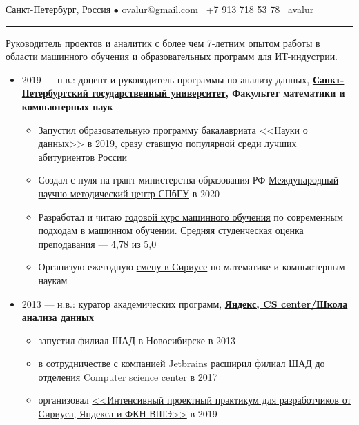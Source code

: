 \documentclass[11pt]{article}
\begin{document}
%

\vspace{0.5em}

\noindent Санкт-Петербург, Россия $\bullet$ \href{mailto:ovalur@gmail.com}{ovalur@gmail.com} \faMobile~+7 913 718 53 78
\faGithub~\href{https://github.com/avalur}{avalur}

\vspace{0.5em}
\hrule
\vspace{0.5em}

Руководитель проектов и аналитик с более чем 7-летним опытом работы в области машинного обучения и образовательных программ для ИТ-индустрии.

\vspace{0.5em}
\begin{itemize}
\item 2019 — н.в.: доцент и руководитель программы по анализу данных, \textbf{\href{https://spbu.ru}{Санкт-Петербургский государственный университет}, Факультет математики и компьютерных наук}

\begin{itemize}
	\item Запустил образовательную программу бакалавриата \href{https://maad.compscicenter.ru}{<<Науки о данных>>} в 2019, сразу ставшую популярной среди лучших абитуриентов России
	\item Создал с нуля на грант министерства образования РФ \href{https://gsom.spbu.ru/all_news/event2021-02-04/}{Международный научно-методический центр СПбГУ} в 2020
	\item Разработал и читаю \href{https://github.com/spbu-math-cs/ml-course/}{годовой курс машинного обучения} по современным подходам в машинном обучении. Средняя студенческая оценка преподавания — 4,78 из 5,0
	\item Организую ежегодную \href{https://sochisirius.ru/obuchenie/nauka/smena1078/5204}{смену в Сириусе} по математике и компьютерным наукам
\end{itemize}

\item 2013 — н.в.: куратор академических программ, \textbf{\href{https://compscicenter.ru}{Яндекс, CS center/Школа анализа данных}}
\begin{itemize}
	\item запустил филиал ШАД в Новосибирске в 2013
	\item в сотрудничестве с компанией Jetbrains расширил филиал ШАД до отделения \href{https://compscicenter.ru}{Computer science center} в 2017
	\item организовал \href{https://sochisirius.ru/obuchenie/graduates/smena240/1174}{<<Интенсивный проектный практикум для разработчиков от Сириуса, Яндекса и ФКН ВШЭ>>} в 2019
\end{itemize}



\end{itemize}
\end{document}
